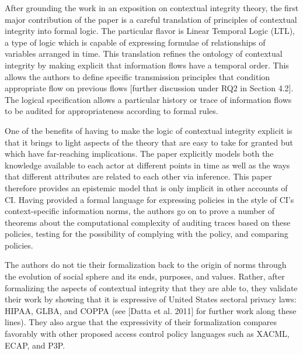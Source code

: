 \documentclass[../thesis.tex]{subfiles}
\begin{document}
\bigskip

After grounding the work in an exposition on contextual integrity
theory, the first major contribution of the paper is a careful
translation of principles of contextual integrity into formal logic.
The particular flavor is Linear Temporal Logic (LTL), a type of logic
which is capable of expressing formulae of relationships of variables
arranged in time. This translation refines the ontology of contextual
integrity by making explicit that information flows have a temporal
order. This allows the authors to define specific transmission
principles that condition appropriate flow on previous flows [further
discussion under RQ2 in Section 4.2]. The logical specification allows
a particular history or trace of information flows to be audited for
appropriateness according to formal rules.


\bigskip

One of the benefits of having to make the logic of contextual integrity
explicit is that it brings to light aspects of the theory that are easy
to take for granted but which have far-reaching implications. The paper
explicitly models both the knowledge available to each actor at
different points in time as well as the ways that different attributes
are related to each other via inference. This paper therefore provides
an epistemic model that is only implicit in other accounts of CI.
Having provided a formal language for expressing policies in the style
of CI's context-specific information norms, the authors
go on to prove a number of theorems about the computational complexity
of auditing traces based on these policies, testing for the possibility
of complying with the policy, and comparing policies.


\bigskip

The authors do not tie their formalization back to the origin of norms
through the evolution of social sphere and its ends, purposes, and
values. Rather, after formalizing the aspects of contextual integrity
that they are able to, they validate their work by showing that it is
expressive of United States sectoral privacy laws: HIPAA, GLBA, and
COPPA (see [Datta et al. 2011] for further work along these lines).
They also argue that the expressivity of their formalization compares
favorably with other proposed access control policy languages such as
XACML, ECAP, and P3P.


\bigskip
\end{document}
